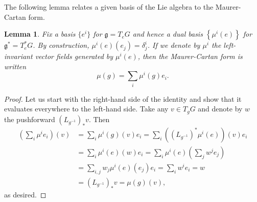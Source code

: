 \documentclass{book}
\newcommand{\fr}{\mathfrak}
\theoremstyle{plain}
\newtheorem{lem}[thm]{Lemma}
\theoremstyle{definition}
\theoremstyle{remark}
\begin{document}
The following lemma relates a given basis of the Lie algebra to the Maurer-Cartan form.
\begin{lem}
    \label{LMC}
    Fix a basis $\{e^i\}$ for $\fr g=T_eG$ and hence a dual basis $\left\{ \mu^i(e) \right\}$ for $\fr g^*=T_e^*G$.
    By construction, $\mu^i(e)(e_j)=\delta^i_j$. If we denote by $\mu^i$ the left-invariant vector fields generated by $\mu^i(e)$, then 
    the Maurer-Cartan form is written
    \[\mu(g)=\sum_i\mu^i(g)e_i.\]
\end{lem}
\begin{proof}
    Let us start with the right-hand side of the identity and show that it evaluates everywhere to the left-hand side.
    Take any $v\in T_gG$ and denote by $w$ the pushforward $(L_{g^{-1}})_*v$. Then
    \begin{align*}
        \left(\sum_i\mu^ie_i\right)(v)&=\sum_i\mu^i(g)(v)e_i=\sum_i\left((L_{g^{-1}})^*\mu^i(e)\right)(v)e_i\\
        &=\sum_i \mu^i(e)(w)e_i=\sum_i\mu^i(e)( \sum_j w^j e_j )\\
        &=\sum_{i,j}w_j\mu^i(e)(e_j)e_i=\sum_iw^ie_i=w\\
        &=(L_{g^{-1}})_{*}v=\mu(g)(v),
    \end{align*}
    as desired.
\end{proof}
\end{document}
